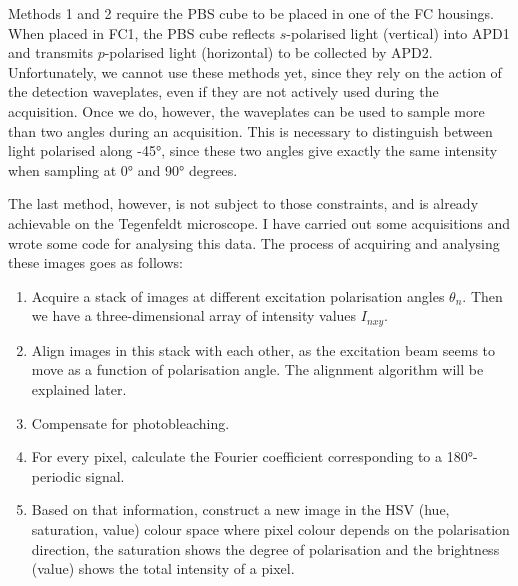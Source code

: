 Methods 1 and 2 require the PBS cube to be placed in one of the FC housings. When placed in FC1, the PBS cube reflects $ s $-polarised light (vertical) into APD1 and transmits $ p $-polarised light (horizontal) to be collected by APD2. Unfortunately, we cannot use these methods yet, since they rely on the action of the detection waveplates, even if they are not actively used during the acquisition. Once we do, however, the waveplates can be used to sample more than two angles during an acquisition. This is necessary to distinguish between light polarised along \ang{+-45}, since these two angles give exactly the same intensity when sampling at \ang{0} and \ang{90} degrees.

The last method, however, is not subject to those constraints, and is already achievable on the Tegenfeldt microscope. I have carried out some acquisitions and wrote some code for analysing this data. The process of acquiring and analysing these images goes as follows:
\begin{enumerate}
	\item Acquire a stack of images at different excitation polarisation angles $ \theta_n $. Then we have a three-dimensional array of intensity values $ I_{nxy} $.
	\item Align images in this stack with each other, as the excitation beam seems to move as a function of polarisation angle. The alignment algorithm will be explained later.
	\item Compensate for photobleaching.
	\item For every pixel, calculate the Fourier coefficient corresponding to a \ang{180}-periodic signal.
	\item Based on that information, construct a new image in the HSV (hue, saturation, value) colour space where pixel colour depends on the polarisation direction, the saturation shows the degree of polarisation and the brightness (value) shows the total intensity of a pixel. 

\end{enumerate}

